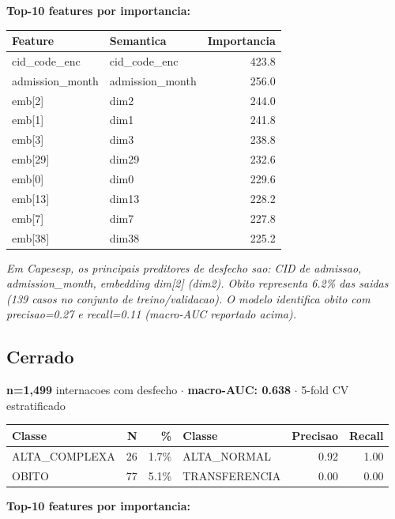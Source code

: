\documentclass[11pt,a4paper]{article}
\begin{document}
\vspace{4pt}\noindent\textbf{Top-10 features por importancia:}

\begin{tabular}{llr}
\toprule
Feature & Semantica & Importancia \\
\midrule
cid\_code\_enc & cid\_code\_enc & 423.8 \\
admission\_month & admission\_month & 256.0 \\
emb[2] & dim2 & 244.0 \\
emb[1] & dim1 & 241.8 \\
emb[3] & dim3 & 238.8 \\
emb[29] & dim29 & 232.6 \\
emb[0] & dim0 & 229.6 \\
emb[13] & dim13 & 228.2 \\
emb[7] & dim7 & 227.8 \\
emb[38] & dim38 & 225.2 \\
\bottomrule
\end{tabular}

\vspace{4pt}\noindent\textit{Em Capesesp, os principais preditores de desfecho sao: CID de admissao, admission\_month, embedding dim[2] (dim2). Obito representa 6.2\% das saidas (139 casos no conjunto de treino/validacao). O modelo identifica obito com precisao=0.27 e recall=0.11 (macro-AUC reportado acima).}

\subsection{Cerrado}
\textbf{n=1,499} internacoes com desfecho $\cdot$ \textbf{macro-AUC: 0.638} $\cdot$ 5-fold CV estratificado

\begin{tabular}{lrr|lrr}
\toprule
Classe & N & \% & Classe & Precisao & Recall \\
\midrule
ALTA\_COMPLEXA & 26 & 1.7\% & ALTA\_NORMAL & 0.92 & 1.00 \\
OBITO & 77 & 5.1\% & TRANSFERENCIA & 0.00 & 0.00 \\
\bottomrule
\end{tabular}

\vspace{4pt}\noindent\textbf{Top-10 features por importancia:}
\end{document}
